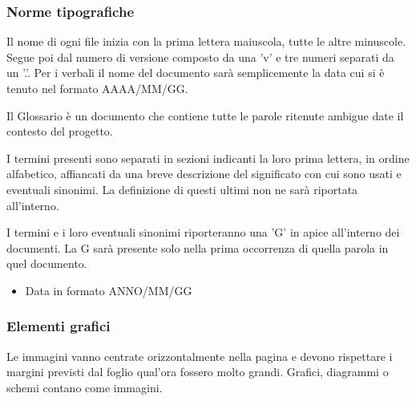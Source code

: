 

\subsubsection{Norme tipografiche}

    Il nome di ogni file inizia con la prima lettera maiuscola, tutte le altre minuscole.
    Segue poi dal numero di versione composto da una 'v' e tre numeri separati da un '.'.
    Per i verbali il nome del documento sarà semplicemente la data cui si è tenuto nel formato
    AAAA/MM/GG.

    \begin{itemize}
    \end{itemize}

    Il Glossario è un documento che contiene tutte le parole ritenute ambigue date il contesto del progetto.

    I termini presenti sono separati in sezioni indicanti la loro prima lettera, in ordine alfabetico, affiancati
    da una breve descrizione del significato con cui sono usati e eventuali sinonimi.
    La definizione di questi ultimi non ne sarà riportata all'interno.

    I termini e i loro eventuali sinonimi riporteranno una 'G' in apice all'interno dei documenti. La G sarà
    presente solo nella prima occorrenza di quella parola in quel documento.

    \begin{itemize}
    \item Data in formato ANNO/MM/GG
    \end{itemize}

\subsubsection{Elementi grafici}

    Le immagini vanno centrate orizzontalmente nella pagina e devono rispettare i margini previsti dal foglio qual'ora
    fossero molto grandi.
    Grafici, diagrammi o schemi contano come immagini.

